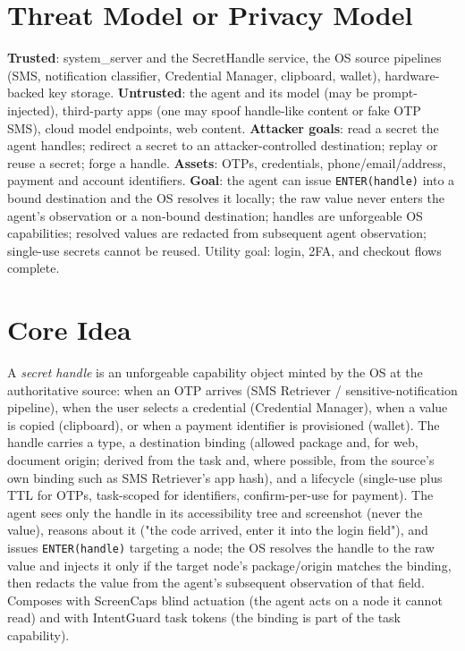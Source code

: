 \documentclass[11pt]{article}
\begin{document}
\section{Threat Model or Privacy Model}
\textbf{Trusted}: system\_server and the SecretHandle service, the OS source pipelines (SMS, notification classifier, Credential Manager, clipboard, wallet), hardware-backed key storage. \textbf{Untrusted}: the agent and its model (may be prompt-injected), third-party apps (one may spoof handle-like content or fake OTP SMS), cloud model endpoints, web content. \textbf{Attacker goals}: read a secret the agent handles; redirect a secret to an attacker-controlled destination; replay or reuse a secret; forge a handle. \textbf{Assets}: OTPs, credentials, phone/email/address, payment and account identifiers. \textbf{Goal}: the agent can issue \texttt{ENTER(handle)} into a bound destination and the OS resolves it locally; the raw value never enters the agent's observation or a non-bound destination; handles are unforgeable OS capabilities; resolved values are redacted from subsequent agent observation; single-use secrets cannot be reused. Utility goal: login, 2FA, and checkout flows complete.

\section{Core Idea}
A \emph{secret handle} is an unforgeable capability object minted by the OS at the authoritative source: when an OTP arrives (SMS Retriever / sensitive-notification pipeline), when the user selects a credential (Credential Manager), when a value is copied (clipboard), or when a payment identifier is provisioned (wallet). The handle carries a type, a destination binding (allowed package and, for web, document origin; derived from the task and, where possible, from the source's own binding such as SMS Retriever's app hash), and a lifecycle (single-use plus TTL for OTPs, task-scoped for identifiers, confirm-per-use for payment). The agent sees only the handle in its accessibility tree and screenshot (never the value), reasons about it ("the code arrived, enter it into the login field"), and issues \texttt{ENTER(handle)} targeting a node; the OS resolves the handle to the raw value and injects it only if the target node's package/origin matches the binding, then redacts the value from the agent's subsequent observation of that field. Composes with ScreenCaps blind actuation (the agent acts on a node it cannot read) and with IntentGuard task tokens (the binding is part of the task capability).
\end{document}
